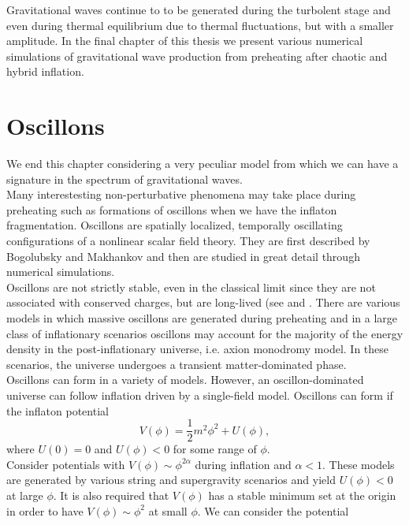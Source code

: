 \documentclass[11pt,a4paper,twoside]{book}
\begin{document}
Gravitational waves continue to to be generated during the turbolent stage and even during thermal equilibrium due to thermal fluctuations, but with a smaller amplitude. In the final chapter of this thesis we present various numerical simulations of gravitational wave production from preheating after chaotic and hybrid inflation.


\section{Oscillons}
We end this chapter considering a very peculiar model from which we can have a signature in the spectrum of gravitational waves. \\
Many interestesting non-perturbative phenomena may take place during preheating such as formations of oscillons when we have the inflaton fragmentation. Oscillons are spatially localized, temporally oscillating configurations of a nonlinear scalar field theory. They are first described by Bogolubsky and Makhankov \cite{Chap5:Oscillon} and then are studied in great detail through numerical simulations. \\
Oscillons are not strictly stable, even in the classical limit since they are not associated  with conserved charges, but are long-lived (see \cite{Chap5:OscillonAfterInflation} and \cite{Chap5:Oscillon_OscillonFormationInThreeDimension}. There are various models in which massive oscillons are generated during preheating and in a large class of inflationary scenarios oscillons may account for the majority of the energy density in the post-inflationary universe, i.e. axion monodromy model. In these scenarios, the universe undergoes a transient matter-dominated phase.\\
Oscillons can form in a variety of models. However, an oscillon-dominated universe  can follow inflation driven by a single-field model. Oscillons can form if the inflaton potential
\begin{equation}
	\label{Chap5:Oscillons_Potential}
	V(\phi)=\frac{1}{2}m^{2}\phi^{2} + U(\phi),
\end{equation}
where $ U(0)=0 $ and $ U(\phi) < 0 $ for some range of $\phi$.\\
Consider potentials with $ V(\phi) \sim \phi^{2\alpha} $ during inflation and $\alpha < 1$. These models are generated by various string and supergravity scenarios and yield $ U(\phi) < 0  $ at large $\phi$. It is also required that $ V(\phi) $ has a stable minimum set at the origin in order to have $ V(\phi) \sim \phi^{2} $ at small $\phi$. We can consider the potential
\end{document}
